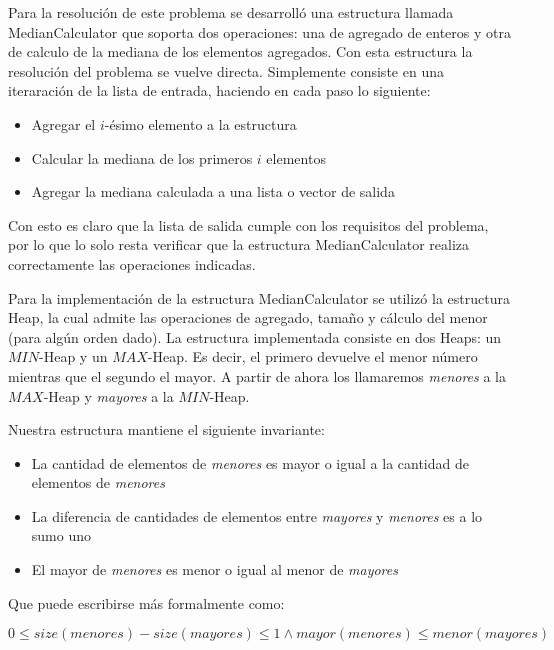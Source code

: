 Para la resoluci\'on de este problema se desarroll\'o una estructura llamada MedianCalculator que soporta dos operaciones: una de agregado de enteros y otra de calculo de la mediana de los elementos agregados. Con esta estructura la resoluci\'on del problema se vuelve directa. Simplemente consiste en una iteraraci\'on de la lista de entrada, haciendo en cada paso lo siguiente:

\begin{itemize}
\item Agregar el $i$-\'esimo elemento a la estructura
\item Calcular la mediana de los primeros $i$ elementos
\item Agregar la mediana calculada a una lista o vector de salida
\end{itemize}

Con esto es claro que la lista de salida cumple con los requisitos del problema, por lo que lo solo resta verificar que la estructura MedianCalculator realiza correctamente las operaciones indicadas.

Para la implementaci\'on de la estructura MedianCalculator se utiliz\'o la estructura Heap, la cual admite las operaciones de agregado, tama\~no y c\'alculo del menor (para alg\'un orden dado). La estructura implementada consiste en dos Heaps: un $MIN$-Heap y un $MAX$-Heap. Es decir, el primero devuelve el menor n\'umero mientras que el segundo el mayor. A partir de ahora los llamaremos \textit{menores} a la $MAX$-Heap y \textit{mayores} a la $MIN$-Heap.

Nuestra estructura mantiene el siguiente invariante: 
\begin{itemize}
\item La cantidad de elementos de \textit{menores} es mayor o igual a la cantidad de elementos de \textit{menores}
\item La diferencia de cantidades de elementos entre \textit{mayores} y \textit{menores} es a lo sumo uno
\item El mayor de \textit{menores} es menor o igual al menor de \textit{mayores}
\end{itemize}

Que puede escribirse m\'as formalmente como:

\begin{center} $0 \le size(menores) - size(mayores) \le 1 \land mayor(menores) \le menor(mayores)$ \\
\end{center}

